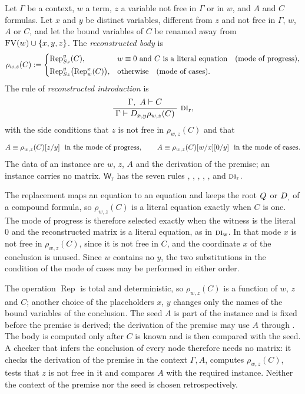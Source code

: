 \begin{definition}
\label{wit:def:recon}
Let $\Gamma$ be a context, $w$ a term, $z$ a variable not free in $\Gamma$ or
in $w$, and $A$ and $C$ formulas.  Let $x$ and $y$ be distinct variables,
different from $z$ and not free in $\Gamma$, $w$, $A$ or $C$, and let the
bound variables of $C$ be renamed away from $\operatorname{FV}(w)\cup\{x,y,z\}$.  The
\emph{reconstructed body} is
\[
 \rho_{w,z}(C)\mathrel{:=}
 \begin{cases}
  \operatorname{Rep}_{S z}^{y}(C),
   & w\equiv 0\text{ and }C\text{ is a literal equation}
     \quad(\text{mode of progress}),\\[0.5ex]
  \operatorname{Rep}_{S z}^{y}\bigl(\operatorname{Rep}_{w}^{x}(C)\bigr),
   & \text{otherwise}\quad(\text{mode of cases}).
 \end{cases}
\]
The rule of \emph{reconstructed introduction} is
\[
 \infrule{\Gamma,\ A\proves C}
         {\Gamma\proves\D{x}{y}\rho_{w,z}(C)}\ \rulename{DI}_{\mathrm{r}},
\]
with the side conditions that $z$ is not free in $\rho_{w,z}(C)$ and that
\[
 A\equiv\rho_{w,z}(C)\subst{z}{y}\ \text{ in the mode of progress},\qquad
 A\equiv\rho_{w,z}(C)\subst{w}{x}\subst{0}{y}\ \text{ in the mode of cases}.
\]
The data of an instance are $w$, $z$, $A$ and the derivation of the premise;
an instance carries no matrix.  $\mathsf{W}_{\mathrm r}$ has the seven rules
, , , , ,
 and $\rulename{DI}_{\mathrm{r}}$.
\end{definition}

The replacement maps an equation to an equation and keeps the root $Q_{}$ or
$D_{,}$ of a compound formula, so $\rho_{w,z}(C)$ is a literal equation
exactly when $C$ is one.  The mode of progress is therefore selected exactly
when the witness is the literal $0$ and the reconstructed matrix is a literal
equation, as in $\rulename{DI}_{\mathrm{w}}$.  In that mode $x$ is not free in
$\rho_{w,z}(C)$, since it is not free in $C$, and the coordinate $x$ of the
conclusion is unused.  Since $w$ contains no $y$, the two substitutions in the
condition of the mode of cases may be performed in either order.

The operation $\operatorname{Rep}$ is total and deterministic, so
$\rho_{w,z}(C)$ is a function of $w$, $z$ and $C$; another choice of the
placeholders $x$, $y$ changes only the names of the bound variables of the
conclusion.  The seed $A$ is part of the instance and is fixed before the
premise is derived; the derivation of the premise may use $A$ through
.  The body is computed only after $C$ is known and is then
compared with the seed.  A checker that infers the conclusion of every node
therefore needs no matrix: it checks the derivation of the premise in the
context $\Gamma,A$, computes $\rho_{w,z}(C)$, tests that $z$ is not free in
it and compares $A$ with the required instance.  Neither the context of the
premise nor the seed is chosen retrospectively.

